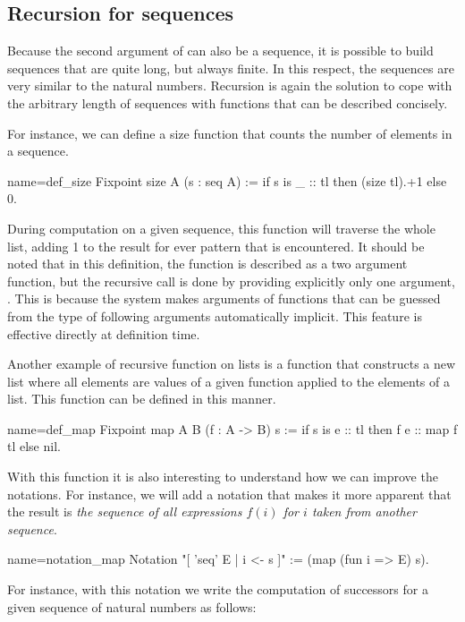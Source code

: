 \subsection{Recursion for sequences}
Because the second argument of  can also be a sequence, it is
possible to build sequences that are quite long, but always finite.
In this respect, the sequences are very similar to the natural
numbers.  Recursion is again the solution to cope with the arbitrary
length of sequences with functions that can be described concisely.

For instance, we can define a size function that counts the number of
elements in a sequence.

\begin{coq}{name=def_size}{}
Fixpoint size A (s : seq A) :=
  if s is _ :: tl then (size tl).+1 else 0.
\end{coq}
During computation on a given sequence, this function will traverse
the whole list, adding 1 to the result for ever
 pattern that is encountered.  It should be noted that in this
definition, the function  is described as a two argument
function, but the recursive call  is done by providing
explicitly only one argument, .  This is because
the \Coq{} system makes
arguments of functions that can be guessed from the type of following
arguments automatically implicit.  This feature is effective directly
at definition time.

Another example of recursive function on lists is a function that constructs
a new list where all elements are values of a given function applied to
the elements of a list.  This function can be defined in this
manner.

\begin{coq}{name=def_map}{}
Fixpoint map A B (f : A -> B) s :=
  if s is e :: tl then f e :: map f tl else nil.
\end{coq}
With this function it is also interesting to understand how we can
improve the notations.  For instance, we will add a notation that
makes it more apparent that the result is {\em the sequence of all
expressions \(f(i)\) for \(i\) taken from another sequence}.

\begin{coq}{name=notation_map}{}
Notation "[ 'seq' E | i <- s ]" := (map (fun i => E) s).
\end{coq}
For instance, with this notation we write the computation of successors
for a given sequence of natural numbers as follows:

